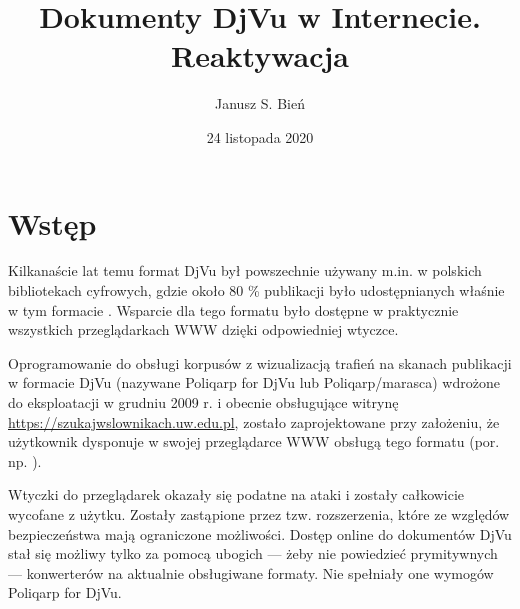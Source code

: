 \documentclass[withmarginpar]{mwart}
\begin{document}
\renewcommand{\figurename}{Ilustracja}

\title{Dokumenty DjVu w Internecie.\\ Reaktywacja}

\author{Janusz S. Bień}


\date{24 listopada 2020\\\doclicenseLongName}

\maketitle

\section{Wstęp}{}

Kilkanaście lat temu format DjVu był powszechnie używany m.in. w polskich
bibliotekach cyfrowych, gdzie około 80 \% publikacji było
udostępnianych właśnie w tym formacie \autocite[s. 311]{bc165}. Wsparcie dla tego
formatu było dostępne w praktycznie wszystkich przeglądarkach WWW dzięki
 odpowiedniej wtyczce.




 Oprogramowanie do obsługi korpusów z wizualizacją trafień na skanach
 publikacji w formacie DjVu (nazywane \textsf{Poliqarp for DjVu} lub
 \textsf{Poliqarp/marasca}) wdrożone do eksploatacji w grudniu 2009
 r. i obecnie obsługujące witrynę
 \url{https://szukajwslownikach.uw.edu.pl}, zostało zaprojektowane
 przy założeniu, że użytkownik dysponuje w swojej przeglądarce WWW
 obsługą tego formatu (por. np. \cite{bc322}).



Wtyczki do przeglądarek okazały się podatne na ataki i zostały
całkowicie wycofane z użytku. Zostały zastąpione przez
tzw. rozszerzenia, które ze względów bezpieczeństwa mają ograniczone
możliwości. Dostęp online do dokumentów DjVu stał się możliwy tylko za
pomocą ubogich --- żeby nie powiedzieć prymitywnych --- konwerterów na
aktualnie obsługiwane formaty. Nie spełniały one wymogów
\textsf{Poliqarp for DjVu}.
\end{document}
